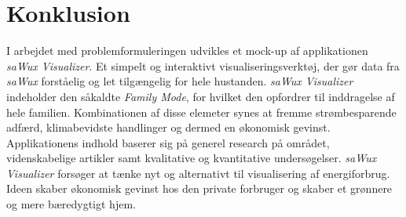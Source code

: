 \chapter{Konklusion}
I arbejdet med problemformuleringen udvikles et mock-up af applikationen \emph{saWux Visualizer}. Et simpelt og interaktivt visualiseringsverktøj, der gør data fra \emph{saWux} forståelig og let tilgængelig for hele hustanden. \emph{saWux Visualizer} indeholder den såkaldte \emph{Family Mode}, for hvilket den opfordrer til inddragelse af hele familien. Kombinationen af disse elemeter synes at fremme strømbesparende adfærd, klimabevidste handlinger og dermed en økonomisk gevinst.\\

Applikationens indhold baserer sig på generel research på området, videnskabelige artikler samt kvalitative og kvantitative undersøgelser. \emph{saWux Visualizer} forsøger at tænke nyt og alternativt til visualisering af energiforbrug. Ideen skaber økonomisk gevinst hos den private forbruger og skaber et grønnere og mere bæredygtigt hjem.
